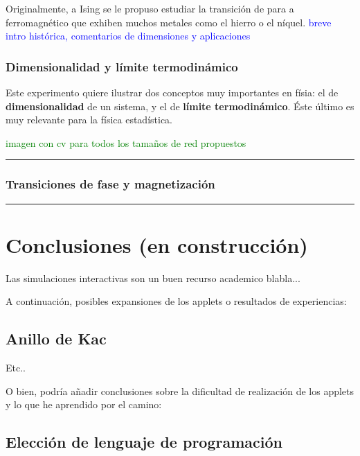 \documentclass[11pt, a4paper]{article} %
\theoremstyle{named}
\begin{document}
        Originalmente, a Ising se le propuso estudiar la transición de para a ferromagnético que exhiben muchos metales como el hierro o el níquel. \textcolor{blue}{breve intro histórica, comentarios de dimensiones y aplicaciones}

        \subsubsection{Dimensionalidad y límite termodinámico}\label{sec:lt}

        Este experimento quiere ilustrar dos conceptos muy importantes en físia: el de \textbf{dimensionalidad} de un sistema, y el de \textbf{límite termodinámico}. Éste último es muy relevante para la física estadística.

        \textcolor{green}{imagen con cv para todos los tamaños de red propuestos}

        \noindent\rule{\linewidth}{0.4pt}

        \subsubsection{Transiciones de fase y magnetización}\label{sec:transiciones}

        \noindent\rule{\linewidth}{0.4pt}

\newpage
\section{Conclusiones (en construcción)}\label{sec:conclusiones}

    Las simulaciones interactivas son un buen recurso academico blabla...

    A continuación, posibles expansiones de los applets o resultados de experiencias:

    \subsection{Anillo de Kac}

    Etc..

    O bien, podría añadir conclusiones sobre la dificultad de realización de los applets y lo que he aprendido por el camino:

    \subsection{Elección de lenguaje de programación}
\end{document}
